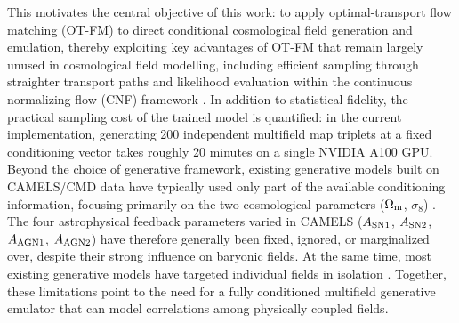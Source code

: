 \documentclass{article}
\newcommand{\Om}{\Omega_{\rm m}}
\newcommand{\sig}{\sigma_8}
\begin{document}
This motivates the central objective of this work: to apply optimal-transport flow
matching (OT-FM) to direct conditional cosmological field generation
and emulation, thereby exploiting key advantages of OT-FM that remain
largely unused in cosmological field modelling, including efficient
sampling through straighter transport paths and likelihood evaluation
within the continuous normalizing flow (CNF) framework \citep{Chen2018}.
In addition to statistical fidelity, the practical sampling cost of the
trained model is quantified: in the current implementation, generating
200 independent multifield map triplets at a fixed conditioning vector
takes roughly 20 minutes on a single NVIDIA A100 GPU.
Beyond the choice of generative framework, existing generative models
built on CAMELS/CMD data have typically used only part of the available
conditioning information, focusing primarily on the two cosmological
parameters ($\Om$, $\sig$)
\citep{Andrianomena2022,Andrianomena2024,Mudur2022DDPM,Hassan2023HIDM,Mudur2024,Mudur2024DiffHMC}.
The four astrophysical feedback parameters varied in CAMELS
($A_{\rm SN1}$, $A_{\rm SN2}$, $A_{\rm AGN1}$, $A_{\rm AGN2}$) have
therefore generally been fixed, ignored, or marginalized over, despite
their strong influence on baryonic fields. At the same time, most
existing generative models have targeted individual fields in isolation
\citep{Hassan2021HIFlow,Mudur2022DDPM,Hassan2023HIDM,Mudur2024}.
Together, these limitations point to the need for a fully conditioned
multifield generative emulator that can model correlations among
physically coupled fields.
\end{document}
